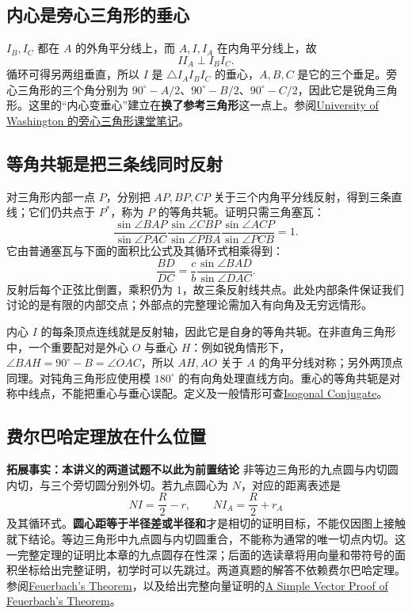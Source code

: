 \documentclass[lang=cn,12pt,fontset=none,a4paper,openany]{beautybook}
\newcommand{\level}[1]{\par\smallskip\noindent\textcolor{coverfgcolor}{\textbf{#1}}\quad}
\begin{document}
\subsection{内心是旁心三角形的垂心}
$I_B,I_C$ 都在 $A$ 的外角平分线上，而 $A,I,I_A$ 在内角平分线上，故
\[
 II_A\perp I_BI_C.
\]
循环可得另两组垂直，所以 $I$ 是 $\triangle I_AI_BI_C$ 的垂心，$A,B,C$ 是它的三个垂足。旁心三角形的三个角分别为 $90^\circ-A/2$、$90^\circ-B/2$、$90^\circ-C/2$，因此它是锐角三角形。这里的“内心变垂心”建立在\textbf{换了参考三角形}这一点上。参阅\href{https://sites.math.washington.edu/~king/coursedir/m444a04/class/class29.html}{University of Washington 的旁心三角形课堂笔记}。

\subsection{等角共轭是把三条线同时反射}
对三角形内部一点 $P$，分别把 $AP,BP,CP$ 关于三个内角平分线反射，得到三条直线；它们仍共点于 $P^*$，称为 $P$ 的等角共轭。证明只需三角塞瓦：
\[
 \frac{\sin\angle BAP}{\sin\angle PAC}
 \frac{\sin\angle CBP}{\sin\angle PBA}
 \frac{\sin\angle ACP}{\sin\angle PCB}=1.
\]
它由普通塞瓦与下面的面积比公式及其循环式相乘得到：
\[
 \frac{BD}{DC}=\frac cb\frac{\sin\angle BAD}{\sin\angle DAC}.
\]
反射后每个正弦比倒置，乘积仍为 $1$，故三条反射线共点。此处内部条件保证我们讨论的是有限的内部交点；外部点的完整理论需加入有向角及无穷远情形。

内心 $I$ 的每条顶点连线就是反射轴，因此它是自身的等角共轭。在非直角三角形中，一个重要配对是外心 $O$ 与垂心 $H$：例如锐角情形下，$\angle BAH=90^\circ-B=\angle OAC$，所以 $AH,AO$ 关于 $A$ 的角平分线对称；另外两顶点同理。对钝角三角形应使用模 $180^\circ$ 的有向角处理直线方向。重心的等角共轭是对称中线点，不能把重心与垂心误配。定义及一般情形可查\href{https://mathworld.wolfram.com/IsogonalConjugate.html}{Isogonal Conjugate}。

\subsection{费尔巴哈定理放在什么位置}
\level{拓展事实：本讲义的两道试题不以此为前置结论}
非等边三角形的九点圆与内切圆内切，与三个旁切圆分别外切。若九点圆心为 $N$，对应的距离表述是
\[
 NI=\frac R2-r,\qquad NI_A=\frac R2+r_A
\]
及其循环式。\textbf{圆心距等于半径差或半径和}才是相切的证明目标，不能仅因图上接触就下结论。等边三角形中九点圆与内切圆重合，不能称为通常的唯一切点内切。这一完整定理的证明比本章的九点圆存在性深；后面的选读章将用向量和带符号的面积坐标给出完整证明，初学时可以先跳过。两道真题的解答不依赖费尔巴哈定理。参阅\href{https://mathworld.wolfram.com/FeuerbachsTheorem.html}{Feuerbach's Theorem}，以及给出完整向量证明的\href{https://arxiv.org/abs/1107.1152}{A Simple Vector Proof of Feuerbach's Theorem}。
\end{document}
